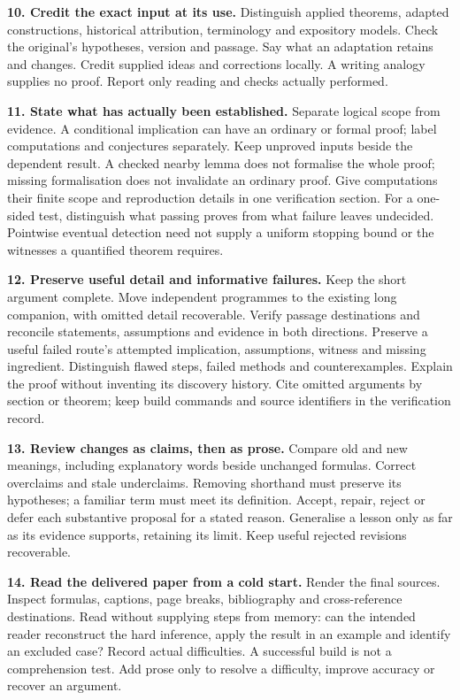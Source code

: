 \documentclass[10pt]{article}
\newcommand{\instruction}[2]{\par\medskip\noindent\textbf{#1.} #2\par}
\begin{document}
\instruction{10. Credit the exact input at its use}{
Distinguish applied theorems, adapted constructions, historical attribution,
terminology and expository models. Check the original's hypotheses, version
and passage. Say what an adaptation retains and changes. Credit supplied
ideas and corrections locally. A writing analogy supplies no proof. Report
only reading and checks actually performed.}

\instruction{11. State what has actually been established}{
Separate logical scope from evidence. A conditional implication can have an
ordinary or formal proof; label computations and conjectures separately. Keep
unproved inputs beside the dependent result. A checked nearby lemma does not
formalise the whole proof; missing formalisation does not invalidate an ordinary
proof. Give computations their finite scope and reproduction details in one
verification section. For a one-sided test, distinguish what passing proves
from what failure leaves undecided. Pointwise eventual detection need not
supply a uniform stopping bound or the witnesses a quantified theorem requires.}

\instruction{12. Preserve useful detail and informative failures}{
Keep the short argument complete. Move independent programmes to the existing
long companion, with omitted detail recoverable. Verify passage destinations and reconcile statements,
assumptions and evidence in both directions. Preserve a useful failed route's
attempted implication, assumptions, witness and missing ingredient. Distinguish
flawed steps, failed methods and counterexamples. Explain the proof without
inventing its discovery history. Cite omitted arguments by section or theorem;
keep build commands and source identifiers in the verification record.}

\instruction{13. Review changes as claims, then as prose}{
Compare old and new meanings, including explanatory words beside unchanged
formulas. Correct overclaims and stale underclaims. Removing shorthand must
preserve its hypotheses; a familiar term must meet its definition. Accept,
repair, reject or defer each substantive proposal for a stated reason.
Generalise a lesson only as far as its evidence supports, retaining its limit.
Keep useful rejected revisions recoverable.}

\instruction{14. Read the delivered paper from a cold start}{
Render the final sources. Inspect formulas, captions, page breaks, bibliography
and cross-reference destinations. Read without supplying steps from memory:
can the intended reader reconstruct the hard inference, apply the result in an
example and identify an excluded case? Record actual difficulties. A successful
build is not a comprehension test. Add prose only to resolve a difficulty,
improve accuracy or recover an argument.}
\end{document}
